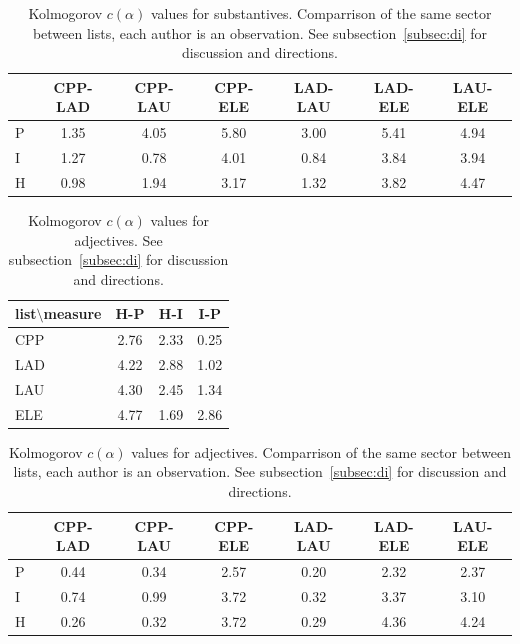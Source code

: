 \documentclass[%
 aip,
 jmp,%
 amsmath,amssymb,
 reprint,%
 floatfix,
]{revtex4-1}
\begin{document}
\begin{table}
  \centering
    \small
\setlength{\tabcolsep}{.06667em}
  \begin{tabular}{|l|| c|c|c|c|c|c|}\hline
& CPP-LAD & CPP-LAU & CPP-ELE & LAD-LAU & LAD-ELE & LAU-ELE \\\hline
P & 1.35 & 4.05 & 5.80 & 3.00 & 5.41 & 4.94 \\\hline
I & 1.27 & 0.78 & 4.01 & 0.84 & 3.84 & 3.94 \\\hline
H & 0.98 & 1.94 & 3.17 & 1.32 & 3.82 & 4.47 \\\hline
  \end{tabular}
  \caption{Kolmogorov $c(\alpha)$ values for substantives. Comparrison of the same sector between lists, each author is an observation. See subsection~\ref{subsec:di} for discussion and directions.}
  \label{tab:kolSubInter}
\end{table}



\begin{table}
  \centering
    \small
\setlength{\tabcolsep}{.26667em}
  \begin{tabular}{|l|| c|c|c|}\hline
list$\setminus$measure & H-P & H-I & I-P \\\hline
CPP & 2.76 & 2.33 & 0.25 \\\hline
LAD & 4.22 & 2.88 & 1.02 \\\hline
LAU & 4.30 & 2.45 & 1.34 \\\hline
ELE & 4.77 & 1.69 & 2.86 \\\hline
  \end{tabular}
  \caption{Kolmogorov $c(\alpha)$ values for adjectives. See subsection~\ref{subsec:di} for discussion and directions.}
  \label{tab:kolAdj}
\end{table}

\begin{table}
  \centering
    \small
\setlength{\tabcolsep}{.06667em}
  \begin{tabular}{|l|| c|c|c|c|c|c|}\hline
 & CPP-LAD & CPP-LAU & CPP-ELE & LAD-LAU & LAD-ELE & LAU-ELE \\\hline
P & 0.44 & 0.34 & 2.57 & 0.20 & 2.32 & 2.37 \\\hline
I & 0.74 & 0.99 & 3.72 & 0.32 & 3.37 & 3.10 \\\hline
H & 0.26 & 0.32 & 3.72 & 0.29 & 4.36 & 4.24 \\\hline
  \end{tabular}
  \caption{Kolmogorov $c(\alpha)$ values for adjectives. Comparrison of the same sector between lists, each author is an observation. See subsection~\ref{subsec:di} for discussion and directions.}
  \label{tab:kolAdjInter}
\end{table}
\end{document}
